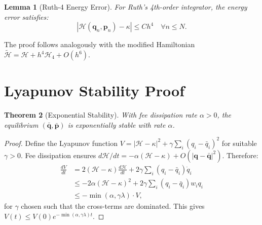 \documentclass[11pt,twocolumn]{article}
\newtheorem{theorem}{Theorem}
\newtheorem{lemma}[theorem]{Lemma}
\begin{document}
\begin{lemma}[Ruth-4 Energy Error]
For Ruth's 4th-order integrator, the energy error satisfies:
\begin{equation}
|\mathcal{H}(\bm{q}_n, \bm{p}_n) - \kappa| \le C h^4 \quad \forall n \le N.
\end{equation}
\end{lemma}

The proof follows analogously with the modified Hamiltonian $\tilde{\mathcal{H}} = \mathcal{H} + h^4\mathcal{H}_4 + O(h^6)$.

\section{Lyapunov Stability Proof}
\label{app:lyapunov}

\begin{theorem}[Exponential Stability]
With fee dissipation rate $\alpha > 0$, the equilibrium $(\bar{\bm{q}}, \bar{\bm{p}})$ is exponentially stable with rate $\alpha$.
\end{theorem}

\begin{proof}
Define the Lyapunov function $V = |\mathcal{H} - \kappa|^2 + \gamma\sum_i(q_i - \bar{q}_i)^2$ for suitable $\gamma > 0$. Fee dissipation ensures $d\mathcal{H}/dt = -\alpha(\mathcal{H} - \kappa) + O(|\bm{q} - \bar{\bm{q}}|^2)$. Therefore:
\begin{align}
\frac{dV}{dt} &= 2(\mathcal{H} - \kappa)\frac{d\mathcal{H}}{dt} + 2\gamma\sum_i(q_i - \bar{q}_i)\dot{q}_i \\
&\le -2\alpha(\mathcal{H} - \kappa)^2 + 2\gamma\sum_i(q_i - \bar{q}_i)w_iq_i \\
&\le -\min(\alpha, \gamma\lambda) \cdot V,
\end{align}
for $\gamma$ chosen such that the cross-terms are dominated. This gives $V(t) \le V(0)e^{-\min(\alpha,\gamma\lambda)t}$.
\end{proof}
\end{document}
